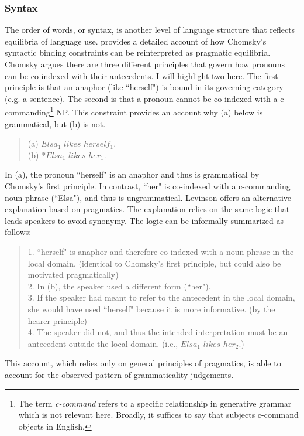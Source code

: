 \documentclass[man, noapacite, 12pt]{apa2}
\begin{document}
\subsubsection{Syntax}
The order of words, or syntax, is another level of language structure that reflects equilibria of language use.  provides a detailed account of how Chomsky's syntactic binding constraints can be reinterpreted as pragmatic equilibria. Chomsky argues there are three different principles that govern how pronouns can be co-indexed with their antecedents. I will highlight two here. The first principle is that an anaphor (like ``herself") is bound in its governing category (e.g. a sentence). The second is that a pronoun cannot be co-indexed with a c-commanding\footnote{The term {\it c-command} refers to a specific relationship in generative grammar which is not relevant here. Broadly, it suffices to say that subjects c-command objects in English.} NP.  This constraint provides an account why (a) below is grammatical, but (b) is not.
 \begin{quote} 
 	(a) $Elsa_1$ $likes$ $herself_1.$\\
 	(b) *$Elsa_1$ $likes$ $her_1.$
\end{quote}
In (a), the pronoun ``herself" is an anaphor and thus is grammatical by Chomsky's first principle. In contrast, ``her" is co-indexed with a c-commanding noun phrase (``Elsa"), and thus is ungrammatical. Levinson offers an alternative explanation based on pragmatics. The explanation relies on the same logic that leads speakers to avoid synonymy. The logic can be informally summarized as follows:
 \begin{quote} 
 	1. ``herself" is  anaphor and therefore co-indexed with a noun phrase in the local domain. (identical to Chomsky's first principle, but could also be motivated pragmatically)\\
	2. In (b), the speaker used a different form (``her").\\
	3. If the speaker had meant to refer to the antecedent in the local domain, she would have used ``herself" because it is more informative. (by the hearer principle)\\
	4. The speaker did not, and thus the intended interpretation must be an antecedent outside the local domain.  (i.e., $Elsa_1$ $likes$ $her_2.$)
\end{quote}
This account, which relies only on general principles of pragmatics, is able to account for the observed pattern of grammaticality judgements.
	
\end{document}
